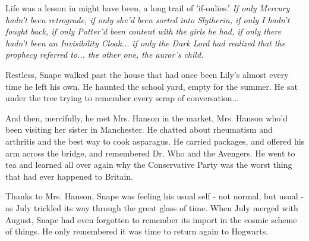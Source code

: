 \documentclass[a4paper,11pt]{article}
\begin{document}
Life was a lesson in might have been, a long trail of 'if-onlies.' \emph{If only Mercury hadn't been retrograde, if only she'd been sorted into Slytherin, if only I hadn't fought back, if only Potter'd been content with the girls he had, if only there hadn't been an Invisibility Cloak... if only the Dark Lord had realized that the prophecy referred to... the other one, the auror's child.}

Restless, Snape walked past the house that had once been Lily's almost every time he left his own. He haunted the school yard, empty for the summer. He sat under the tree trying to remember every scrap of conversation...

And then, mercifully, he met Mrs. Hanson in the market, Mrs. Hanson who'd been visiting her sister in Manchester. He chatted about rheumatism and arthritis and the best way to cook asparagus. He carried packages, and offered his arm across the bridge, and remembered Dr. Who and the Avengers. He went to tea and learned all over again why the Conservative Party was the worst thing that had ever happened to Britain.

Thanks to Mrs. Hanson, Snape was feeling his usual self - not normal, but usual - as July trickled its way through the great glass of time. When July merged with August, Snape had even forgotten to remember its import in the cosmic scheme of things. He only remembered it was time to return again to Hogwarts.
\end{document}
